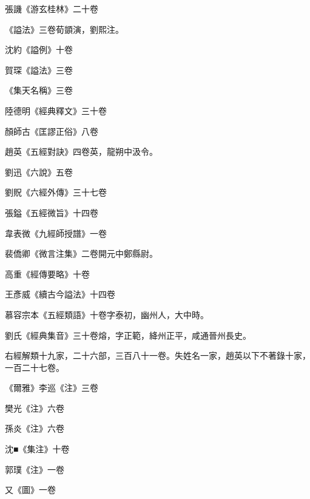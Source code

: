 \begin{pinyinscope}
 張譏《游玄桂林》二十卷



 《謚法》三卷荀顗演，劉熙注。



 沈約《謚例》十卷



 賀琛《謚法》三卷



 《集天名稱》三卷



 陸德明《經典釋文》三十卷



 顏師古《匡謬正俗》八卷



 趙英《五經對訣》四卷英，龍朔中汲令。



 劉迅《六說》五卷



 劉貺《六經外傳》三十七卷



 張鎰《五經微旨》十四卷



 韋表微《九經師授譜》一卷



 裴僑卿《微言注集》二卷開元中鄭縣尉。



 高重《經傳要略》十卷



 王彥威《續古今謚法》十四卷



 慕容宗本《五經類語》十卷字泰初，幽州人，大中時。



 劉氏《經典集音》三十卷熔，字正範，絳州正平，咸通晉州長史。



 右經解類十九家，二十六部，三百八十一卷。失姓名一家，趙英以下不著錄十家，一百二十七卷。



 《爾雅》李巡《注》三卷



 樊光《注》六卷



 孫炎《注》六卷



 沈■《集注》十卷



 郭璞《注》一卷



 又《圖》一卷




\end{pinyinscope}
